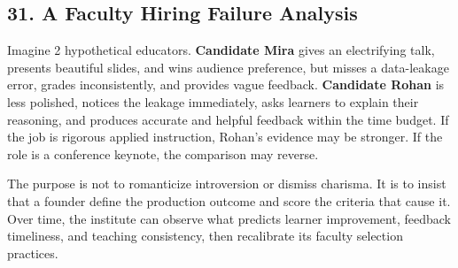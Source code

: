 \subsection*{31. A Faculty Hiring Failure Analysis}

Imagine 2 hypothetical educators. \textbf{Candidate Mira} gives an electrifying talk, presents beautiful slides, and wins audience preference, but misses a data-leakage error, grades inconsistently, and provides vague feedback. \textbf{Candidate Rohan} is less polished, notices the leakage immediately, asks learners to explain their reasoning, and produces accurate and helpful feedback within the time budget. If the job is rigorous applied instruction, Rohan's evidence may be stronger. If the role is a conference keynote, the comparison may reverse.

The purpose is not to romanticize introversion or dismiss charisma. It is to insist that a founder define the production outcome and score the criteria that cause it. Over time, the institute can observe what predicts learner improvement, feedback timeliness, and teaching consistency, then recalibrate its faculty selection practices.
